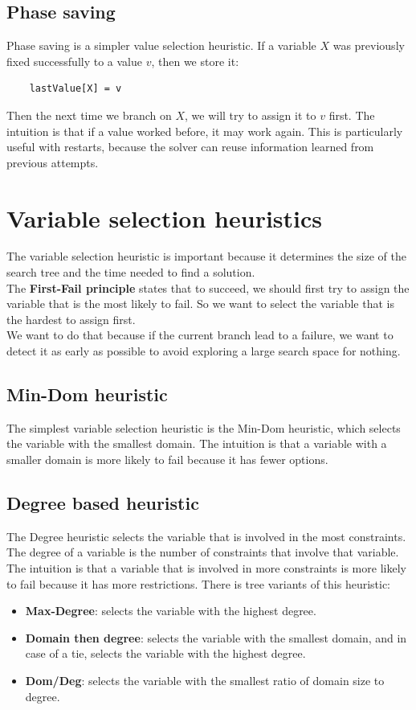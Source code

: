 \documentclass[12pt, openany]{report}
\theoremstyle{definition}
\begin{document}
\subsection{Phase saving}
Phase saving is a simpler value selection heuristic. If a variable $X$ was previously fixed successfully to a value $v$, then we store it:
\begin{lstlisting}
    lastValue[X] = v
\end{lstlisting}
Then the next time we branch on $X$, we will try to assign it to $v$ first. The intuition is that if a value worked before, it may work again. This is particularly useful with restarts, because the solver can reuse information learned from previous attempts.
\section{Variable selection heuristics}
The variable selection heuristic is important because it determines the size of the search tree and the time needed to find a solution.\\
The \textbf{First-Fail principle} states that to succeed, we should first try to assign the variable that is the most likely to fail. So we want to select the variable that is the hardest to assign first.\\
We want to do that because if the current branch lead to a failure, we want to detect it as early as possible to avoid exploring a large search space for nothing.
\subsection{Min-Dom heuristic}
The simplest variable selection heuristic is the Min-Dom heuristic, which selects the variable with the smallest domain. The intuition is that a variable with a smaller domain is more likely to fail because it has fewer options.
\subsection{Degree based heuristic}
The Degree heuristic selects the variable that is involved in the most constraints. The degree of a variable is the number of constraints that involve that variable. The intuition is that a variable that is involved in more constraints is more likely to fail because it has more restrictions. There is tree variants of this heuristic:
\begin{itemize}
    \item \textbf{Max-Degree}: selects the variable with the highest degree.
    \item \textbf{Domain then degree}: selects the variable with the smallest domain, and in case of a tie, selects the variable with the highest degree.
    \item \textbf{Dom/Deg}: selects the variable with the smallest ratio of domain size to degree.  
\end{itemize}
\end{document}
